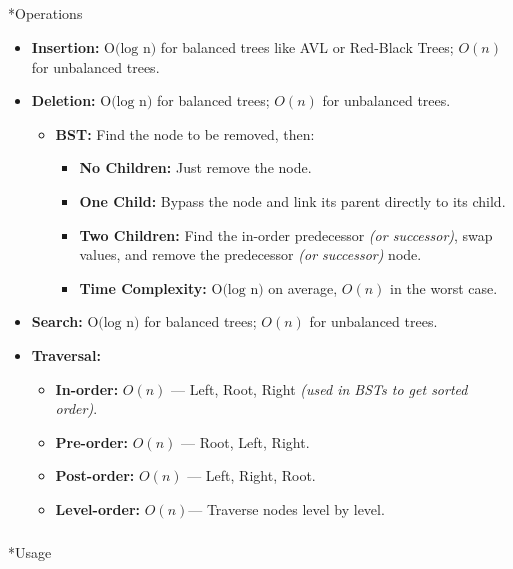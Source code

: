 \documentclass[
  letterpaper,
  DIV=11,
  numbers=noendperiod]{scrreprt}
\makeatletter
\let\oldsubparagraph\subparagraph
\renewcommand{\subparagraph}{
    \@ifstar
      \xxxSubParagraphStar
      \xxxSubParagraphNoStar
  }
\newcommand{\xxxSubParagraphStar}[1]{\oldsubparagraph*{#1}\mbox{}}
\newcommand{\xxxSubParagraphNoStar}[1]{\oldsubparagraph{#1}\mbox{}}
\providecommand{\tightlist}{%
  \setlength{\itemsep}{0pt}\setlength{\parskip}{0pt}}
\makeatother
\begin{document}
\begin{tcolorbox}[enhanced jigsaw, colframe=quarto-callout-note-color-frame, toprule=.15mm, bottomrule=.15mm, rightrule=.15mm, colback=white, breakable, arc=.35mm, opacityback=0, left=2mm, leftrule=.75mm]
\subparagraph*{Operations}\label{operations-7}

\begin{itemize}
\item
  \textbf{Insertion:} \(\text{O(log ⁡n)}\) for balanced trees like AVL or
  Red-Black Trees; \(O(n)\) for unbalanced trees.
\item
  \textbf{Deletion:} \(\text{O(log ⁡n)}\) for balanced trees; \(O(n)\)
  for unbalanced trees.

  \begin{itemize}
  \tightlist
  \item
    \textbf{BST:} Find the node to be removed, then:

    \begin{itemize}
    \tightlist
    \item
      \textbf{No Children:} Just remove the node.
    \item
      \textbf{One Child:} Bypass the node and link its parent directly
      to its child.
    \item
      \textbf{Two Children:} Find the in-order predecessor \emph{(or
      successor)}, swap values, and remove the predecessor \emph{(or
      successor)} node.
    \item
      \textbf{Time Complexity:} \(\text{O(log n)}\) on average, \(O(n)\)
      in the worst case.
    \end{itemize}
  \end{itemize}
\item
  \textbf{Search:} \(\text{O(log ⁡n)}\) for balanced trees; \(O(n)\) for
  unbalanced trees.
\item
  \textbf{Traversal:}

  \begin{itemize}
  \tightlist
  \item
    \textbf{In-order:} \(O(n)\) --- Left, Root, Right \emph{(used in
    BSTs to get sorted order)}.
  \item
    \textbf{Pre-order:} \(O(n)\) --- Root, Left, Right.
  \item
    \textbf{Post-order:} \(O(n)\) --- Left, Right, Root.
  \item
    \textbf{Level-order:} \(O(n)\)--- Traverse nodes level by level.
  \end{itemize}
\end{itemize}

\subparagraph*{Usage}\label{usage-23}


\end{tcolorbox}
\end{document}
